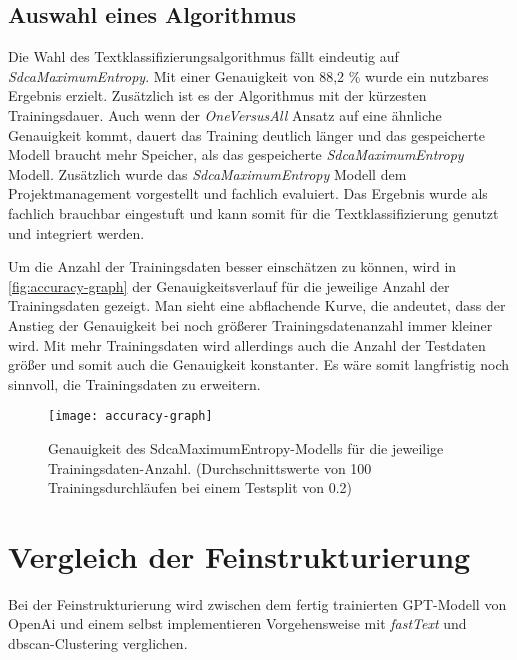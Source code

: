\subsection{Auswahl eines Algorithmus}
\label{c:comparison:classification:selection}
Die Wahl des Textklassifizierungsalgorithmus fällt eindeutig auf \textit{SdcaMaximumEntropy}. Mit einer Genauigkeit von 88,2 \% wurde ein nutzbares Ergebnis erzielt. Zusätzlich ist es der Algorithmus mit der kürzesten Trainingsdauer. Auch wenn der \textit{OneVersusAll} Ansatz auf eine ähnliche Genauigkeit kommt, dauert das Training deutlich länger und das gespeicherte Modell braucht mehr Speicher, als das gespeicherte \textit{SdcaMaximumEntropy} Modell. 
Zusätzlich wurde das \textit{SdcaMaximumEntropy} Modell dem Projektmanagement vorgestellt und fachlich evaluiert. Das Ergebnis wurde als fachlich brauchbar eingestuft und kann somit für die Textklassifizierung genutzt und integriert werden.

Um die Anzahl der Trainingsdaten besser einschätzen zu können, wird in \autoref{fig:accuracy-graph} der Genauigkeitsverlauf für die jeweilige Anzahl der Trainingsdaten gezeigt. Man sieht eine abflachende Kurve, die andeutet, dass der Anstieg der Genauigkeit bei noch größerer Trainingsdatenanzahl immer kleiner wird. Mit mehr Trainingsdaten wird allerdings auch die Anzahl der Testdaten größer und somit auch die Genauigkeit konstanter. Es wäre somit langfristig noch sinnvoll, die Trainingsdaten zu erweitern.

\begin{figure}[h]
	\centering
	\texttt{[image: accuracy-graph]}
	\caption[Genauigkeit des SdcaMaximumEntropy-Modells]{Genauigkeit des SdcaMaximumEntropy-Modells für die jeweilige Trainingsdaten-Anzahl. (Durchschnittswerte von 100 Trainingsdurchläufen bei einem Testsplit von 0.2)}
	\label{fig:accuracy-graph}
\end{figure}

\section{Vergleich der Feinstrukturierung}
\label{c:comparison:fine-structuring}
Bei der Feinstrukturierung wird zwischen dem fertig trainierten GPT-Modell von OpenAi und einem selbst implementieren Vorgehensweise mit \textit{fastText} und \ac{dbscan}-Clustering verglichen.
